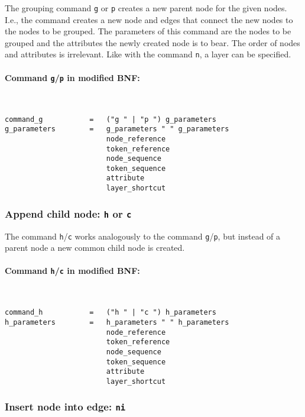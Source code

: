 \documentclass[12pt]{scrartcl}
\begin{document}
The grouping command \texttt{g} or \texttt{p} creates a new parent node for the given nodes.
I.e., the command creates a new node and edges that connect the new nodes to the nodes to be grouped.
The parameters of this command are the nodes to be grouped and the attributes the newly created node is to bear.
The order of nodes and attributes is irrelevant.
Like with the command \texttt{n}, a layer can be specified.

\paragraph*{Command \texttt{g}/\texttt{p} in modified BNF:}
~
\begin{framed}
\begin{lstlisting}
command_g           =   ("g " | "p ") g_parameters
g_parameters        =   g_parameters " " g_parameters
                        node_reference
                        token_reference
                        node_sequence
                        token_sequence
                        attribute
                        layer_shortcut
\end{lstlisting}
\end{framed}


\subsubsection{Append child node: \texttt{h} or \texttt{c}}

The command \texttt{h}/\texttt{c} works analogously to the command \texttt{g}/\texttt{p}, but instead of a parent node a new common child node is created.

\paragraph*{Command \texttt{h}/\texttt{c} in modified BNF:}
~
\begin{framed}
\begin{lstlisting}
command_h           =   ("h " | "c ") h_parameters
h_parameters        =   h_parameters " " h_parameters
                        node_reference
                        token_reference
                        node_sequence
                        token_sequence
                        attribute
                        layer_shortcut
\end{lstlisting}
\end{framed}


\subsubsection{Insert node into edge: \texttt{ni}}
\end{document}
